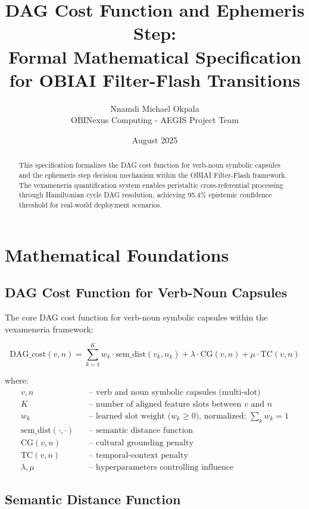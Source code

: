 \documentclass[11pt]{article}
\title{DAG Cost Function and Ephemeris Step: \\
Formal Mathematical Specification for OBIAI Filter-Flash Transitions}
\author{Nnamdi Michael Okpala \\
OBINexus Computing - AEGIS Project Team}
\date{August 2025}
\begin{document}
\maketitle

\begin{abstract}
This specification formalizes the DAG cost function for verb-noun symbolic capsules and the ephemeris step decision mechanism within the OBIAI Filter-Flash framework. The vexameneria quantification system enables peristaltic cross-referential processing through Hamiltonian cycle DAG resolution, achieving 95.4\% epistemic confidence threshold for real-world deployment scenarios.
\end{abstract}

\section{Mathematical Foundations}

\subsection{DAG Cost Function for Verb-Noun Capsules}

The core DAG cost function for verb-noun symbolic capsules within the vexameneria framework:

\begin{equation}
\text{DAG\_cost}(v,n) = \sum_{k=1}^{K} w_k \cdot \text{sem\_dist}(v_k, n_k) + \lambda \cdot \text{CG}(v,n) + \mu \cdot \text{TC}(v,n)
\end{equation}

\noindent where:
\begin{align}
v,n &\quad \text{-- verb and noun symbolic capsules (multi-slot)} \\
K &\quad \text{-- number of aligned feature slots between } v \text{ and } n \\
w_k &\quad \text{-- learned slot weight (}w_k \geq 0\text{), normalized: } \sum_k w_k = 1 \\
\text{sem\_dist}(\cdot,\cdot) &\quad \text{-- semantic distance function} \\
\text{CG}(v,n) &\quad \text{-- cultural grounding penalty} \\
\text{TC}(v,n) &\quad \text{-- temporal-context penalty} \\
\lambda,\mu &\quad \text{-- hyperparameters controlling influence}
\end{align}

\subsection{Semantic Distance Function}
\end{document}
